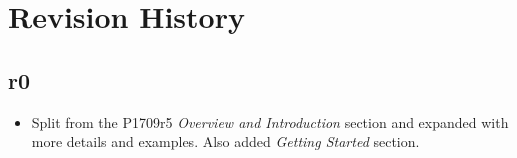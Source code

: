 \section{Revision History}

\subsection*{\paperno r0}

\begin{itemize}
      \item Split from the P1709r5 \textit{Overview and Introduction} section and expanded with 
            more details and examples. Also added \textit{Getting Started} section.
\end{itemize}
